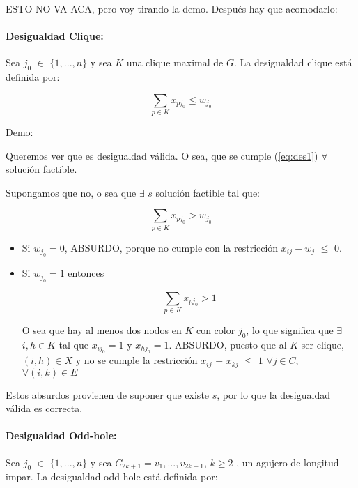 \documentclass[a4paper]{article}
\begin{document}
ESTO NO VA ACA, pero voy tirando la demo. Después hay que acomodarlo:

\paragraph{Desigualdad Clique:} Sea $j_0$ $\in$ $ \{ 1,...,n \} $ y sea $K$ una clique maximal de $G$. La desigualdad clique está definida por:

\begin{equation} \label{eq:des1}
\sum_{p \in K} x_{pj_0} \leq w_{j_0}
\end{equation}

Demo:

Queremos ver que es desigualdad válida. O sea, que se cumple (\ref{eq:des1}) $\forall$ solución factible.

Supongamos que no, o sea que $\exists$ $s$ solución factible tal que:

\begin{equation*}
\sum_{p \in K} x_{pj_0} > w_{j_0}
\end{equation*}

\begin{itemize}

	\item Si $w_{j_0} = 0$, ABSURDO, porque no cumple con la restricción $x_{ij} - w_j$ $\leq$ $0$.
	
	\item Si $w_{j_0} = 1$ entonces
	
	\begin{equation*}
	\sum_{p \in K} x_{pj_0} > 1
	\end{equation*}

	O sea que hay al menos dos nodos en $K$ con color $j_0$, lo que significa que $\exists$ $i,h \in K$ tal que $x_{ij_0} =1$ y $x_{hj_0} =1$.
	ABSURDO, puesto que al $K$ ser clique, $(i,h) \in X$ y no se cumple la restricción $x_{ij}$ $+$ $x_{kj}$ $\leq$ $1$   $\forall j \in C$, $\forall (i,k) \in E$
\end{itemize}

Estos absurdos provienen de suponer que existe $s$, por lo que la desigualdad válida es correcta.


\paragraph{Desigualdad Odd-hole:} Sea $j_0$ $\in$ $ \{ 1,...,n \} $ y sea $C_{2k+1} = v_1 ,..., v_{2k+1}$, $k \geq 2$ , un agujero de longitud impar. La desigualdad odd-hole está definida por:
\end{document}
